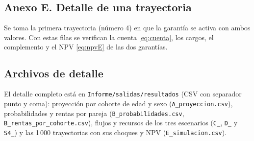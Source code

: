 \documentclass[10pt,a4paper]{article}
\numberwithin{equation}{section}
\newcommand{\tabla}[1]{}
\newcommand{\um}{u.m.}
\begin{document}
	\subsection*{Anexo E. Detalle de una trayectoria}

	Se toma la primera trayectoria (número 4) en que la garantía se activa con ambos valores. Con estas filas se verifican la cuenta \eqref{eq:cuenta}, los cargos, el complemento y el NPV \eqref{eq:npvE} de las dos garantías.

	\begin{table}[htbp]
		\centering\small
		\tabla{E_trayectoria_detalle}
		\caption{Trayectoria 4: choques, saldo de la cuenta, cargos y su valor presente ponderado por permanencia, en \um}\label{tab:tray}
	\end{table}

	\begin{table}[htbp]
		\centering\small
		\tabla{E_trayectoria_detalle_resumen}
		\caption{Trayectoria 4: complemento al vencimiento y NPV con ambas garantías, en \um}\label{tab:trayres}
	\end{table}

	\subsection*{Archivos de detalle}

	El detalle completo está en \texttt{Informe/salidas/resultados} (CSV con separador punto y coma): proyección por cohorte de edad y sexo (\texttt{A\_proyeccion.csv}), probabilidades y rentas por pareja (\texttt{B\_probabilidades.csv}, \texttt{B\_rentas\_por\_cohorte.csv}), flujos y recursos de los tres escenarios (\texttt{C\_}, \texttt{D\_} y \texttt{S4\_}) y las 1\,000 trayectorias con sus choques y NPV (\texttt{E\_simulacion.csv}).
\end{document}
